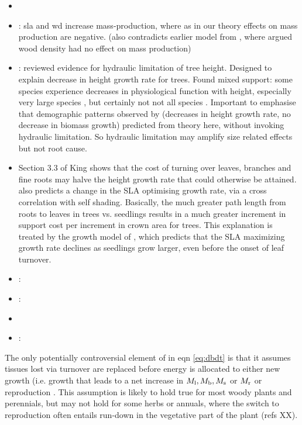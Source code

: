 \documentclass[a4paper,11pt]{article}
\begin{document}
\begin{itemize}
  \item \citet{Ishihara-2016}
  \item  \citet{Enquist-2007}: sla and wd increase mass-production, where as in our theory effects on mass production are negative. (also contradicts earlier model from \citet{Enquist-1999}, where argued wood density had no effect on mass production)
  \item \citet{Ryan-2006}: reviewed evidence for hydraulic limitation of tree height. Designed to explain decrease in height growth rate for trees. Found mixed support: some species experience decreases in physiological function with height, especially very large species \citep{Koch-2004}, but certainly not not all species \citep{Ryan-2006}. Important to emphasise that demographic patterns observed by \citep{Ryan-2006} (decreases in height growth rate, no decrease in biomass growth) predicted from theory here, without invoking hydraulic limitation. So hydraulic limitation may amplify size related effects but not root cause.
  \item \citet{King-2005} Section 3.3 of King  shows that the cost of turning over leaves, branches and fine roots may halve the height growth rate that could otherwise be attained. \citet{King-1999} also predicts a change in the SLA optimising growth rate, via a cross correlation with self shading. Basically, the much greater path length from roots to leaves in trees vs. seedlings results in a much greater increment in support cost per increment in crown area for trees. This explanation is treated by the growth model of \citet{King-1999}, which predicts that the SLA maximizing growth rate declines as seedlings grow larger, even before the onset of leaf turnover.
  \item \citet{King-1999}:
  \item \citet{Li-2014}:
  \item \citep{Givnish-1988,Yokozawa-1995,Makela-1997,King-2011,Moorcroft-2001}
  \item \citep{Coomes-2011}:
\end{itemize}


The only potentially controversial element of in eqn \ref{eq:dbdt} is that it assumes tissues lost via turnover are replaced before energy is allocated to either new growth (i.e. growth that leads to a net increase in $M_{\rm l}, M_{\rm b}, M_{\rm s}$ or $M_{\rm r}$ or reproduction \citep{Thornley-2000}. This assumption is likely to hold true for most woody plants and perennials, but may not hold for some herbs or annuals, where the switch to reproduction often entails run-down in the vegetative part of the plant (refs XX).
\end{document}
